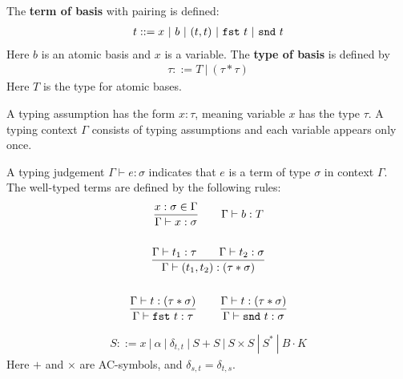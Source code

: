 \begin{definition}
  The \textbf{term of basis} with pairing is defined:
  \begin{align*}
    t ::= x\ |\ b\ |\ (t, t)\ |\ \texttt{fst}\ t\ |\ \texttt{snd}\ t
  \end{align*}
  Here $b$ is an atomic basis and $x$ is a variable. The \textbf{type of basis} is defined by
  \begin{align*}
    \tau ::= T\ |\ (\tau * \tau)
  \end{align*}
  Here $T$ is the type for atomic bases.
\end{definition}

\begin{definition}
  A typing assumption has the form $x : \tau$, meaning variable $x$ has the type $\tau$. A typing context $\Gamma$ consists of typing assumptions and each variable appears only once.

  A typing judgement $\Gamma \vdash e : \sigma$ indicates that $e$ is a term of type $\sigma$ in context $\Gamma$. The well-typed terms are defined by the following rules:
  \begin{gather*}
    \frac{x : \sigma \in \Gamma}{\Gamma \vdash x : \sigma}
    \qquad 
    \Gamma \vdash b : T\\
    \\
    \frac{\Gamma \vdash t_1 : \tau \qquad \Gamma \vdash t_2 : \sigma}{\Gamma \vdash (t_1, t_2) : ( \tau * \sigma )} \\
    \\
    \frac{\Gamma \vdash t : ( \tau * \sigma )}{\Gamma \vdash \texttt{fst}\ t : \tau}
    \qquad
    \frac{\Gamma \vdash t : ( \tau * \sigma )}{\Gamma \vdash \texttt{snd}\ t : \sigma}
  \end{gather*}


\begin{definition}
  \begin{align*}
    S ::= x\ |\ \alpha\ |\ \delta_{t, t}\ |\ S + S\ |\ S \times S\ |\ S^*\ |\ B \cdot K
  \end{align*}
  Here $+$ and $\times$ are AC-symbols, and $\delta_{s, t} = \delta_{t, s}$.
\end{definition}


\end{definition}
